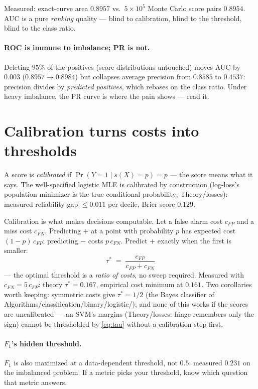\documentclass[11pt]{article}
\begin{document}
Measured: exact-curve area $0.8957$ vs.\ $5\times10^5$ Monte Carlo
score pairs $0.8954$. AUC is a pure \emph{ranking} quality --- blind
to calibration, blind to the threshold, blind to the class ratio.

\paragraph{ROC is immune to imbalance; PR is not.} Deleting $95\%$ of
the positives (score distributions untouched) moves AUC by $0.003$
($0.8957 \to 0.8984$) but collapses average precision from $0.8585$ to
$0.4537$: precision divides by \emph{predicted positives}, which
rebases on the class ratio. Under heavy imbalance, the PR curve is
where the pain shows --- read it.

\section{Calibration turns costs into thresholds}

A score is \emph{calibrated} if $\Pr(Y{=}1 \mid s(X) = p) = p$ ---
the score means what it says. The well-specified logistic MLE is
calibrated by construction (log-loss's population minimizer is the
true conditional probability; Theory/losses): measured reliability gap
$\le 0.011$ per decile, Brier score $0.129$.

Calibration is what makes decisions computable. Let a false alarm cost
$c_{FP}$ and a miss cost $c_{FN}$. Predicting $+$ at a point with
probability $p$ has expected cost $(1-p)\,c_{FP}$; predicting $-$
costs $p\,c_{FN}$. Predict $+$ exactly when the first is smaller:
\begin{equation}
  \boxed{\;\tau^\ast \;=\; \frac{c_{FP}}{c_{FP} + c_{FN}}\;}
  \label{eq:tau}
\end{equation}
--- the optimal threshold is a \emph{ratio of costs}, no sweep
required. Measured with $c_{FN} = 5\,c_{FP}$: theory $\tau^\ast =
0.167$, empirical cost minimum at $0.161$. Two corollaries worth
keeping: symmetric costs give $\tau^\ast = 1/2$ (the Bayes classifier
of Algorithms/classification/binary/logistic/); and none of this works if the scores are
uncalibrated --- an SVM's margins (Theory/losses: hinge remembers only
the sign) cannot be thresholded by \eqref{eq:tau} without a
calibration step first.

\paragraph{$F_1$'s hidden threshold.} $F_1$ is also maximized at a
data-dependent threshold, not $0.5$: measured $0.231$ on the
imbalanced problem. If a metric picks your threshold, know which
question that metric answers.
\end{document}
